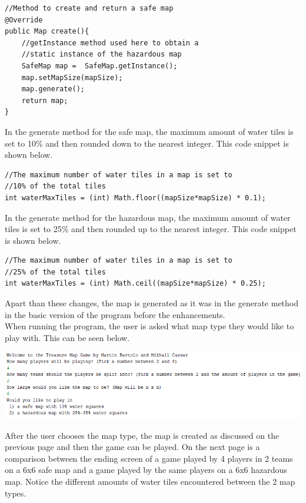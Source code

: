 \documentclass[a4paper,12pt]{extarticle}
\begin{document}
\vspace{-1mm}
\begin{lstlisting}
//Method to create and return a safe map
@Override
public Map create(){
    //getInstance method used here to obtain a 
    //static instance of the hazardous map
    SafeMap map =  SafeMap.getInstance();
    map.setMapSize(mapSize);
    map.generate();
    return map;
}
\end{lstlisting}

\noindent In the generate method for the safe map, the maximum amount of water tiles is set to 10\% and then rounded down to the nearest integer. This code snippet is shown below.

\begin{lstlisting}
//The maximum number of water tiles in a map is set to
//10% of the total tiles
int waterMaxTiles = (int) Math.floor((mapSize*mapSize) * 0.1);
\end{lstlisting}
\vspace{4mm}

\noindent In the generate method for the hazardous map, the maximum amount of water tiles is set to 25\% and then rounded up to the nearest integer. This code snippet is shown below.

\begin{lstlisting}
//The maximum number of water tiles in a map is set to 
//25% of the total tiles
int waterMaxTiles = (int) Math.ceil((mapSize*mapSize) * 0.25);
\end{lstlisting}
\vspace{4mm}

\noindent Apart than these changes, the map is generated as it was in the generate method in the basic version of the program before the enhancements.\\

\noindent When running the program, the user is asked what map type they would like to play with. This can be seen below.

\begin{center}
\includegraphics[width=\textwidth]{Figure1.png}
\end{center}

\noindent After the user chooses the map type, the map is created as discussed on the previous page and then the game can be played. On the next page is a comparison between the ending screen of a game played by 4 players in 2 teams on a 6x6 safe map and a game played by the same players on a 6x6 hazardous map. Notice the different amounts of water tiles encountered between the 2 map types.
\newpage
\end{document}
